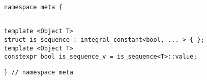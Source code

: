 
\begin{verbatim}
namespace meta {
\end{verbatim}
\begin{verbatim}

template <Object T>
struct is_sequence : integral_constant<bool, ... > { };
template <Object T>
constexpr bool is_sequence_v = is_sequence<T>::value;

\end{verbatim}
\begin{verbatim}
} // namespace meta
\end{verbatim}
